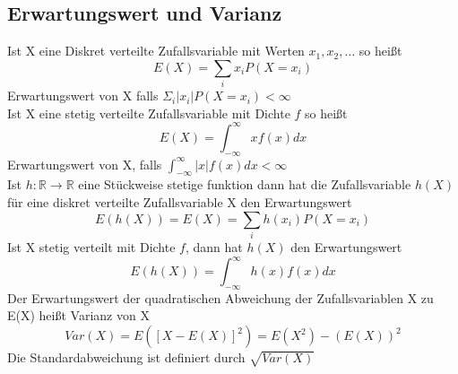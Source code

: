 \documentclass[
	ngerman,
	accentcolor=9c,%
	type=intern,
	marginpar=false
	]{tudapub}
\begin{document}
        \subsection{Erwartungswert und Varianz}
            Ist X eine Diskret verteilte Zufallsvariable mit Werten $x_1, x_2, \dots$ so heißt
            \begin{equation*}
                E(X) = \sum_i x_i P(X=x_i)
            \end{equation*}
            Erwartungswert von X falls $\Sigma_i |x_i| P(X=x_i) < \infty$\\
            Ist X eine stetig verteilte Zufallsvariable mit Dichte $f$ so heißt
            \begin{equation*}
                E(X) = \int_{-\infty}^\infty x f(x) dx 
            \end{equation*}
            Erwartungswert von X, falls $\int_{-\infty}^\infty |x| f(x) dx < \infty$\\
            Ist $h: \mathbb{R} \rightarrow \mathbb{R}$ eine Stückweise stetige funktion dann hat die Zufallsvariable $h(X)$
            für eine diskret verteilte Zufallsvariable X den Erwartungswert
            \begin{equation*}
                E(h(X)) = E(X) = \sum_i h(x_i) P(X=x_i)
            \end{equation*}
            Ist X stetig verteilt mit Dichte $f$, dann hat $h(X)$ den Erwartungswert
            \begin{equation*}
                E(h(X)) = \int_{-\infty}^\infty h(x) f(x) dx 
            \end{equation*}
            Der Erwartungswert  der quadratischen Abweichung der Zufallsvariablen X zu E(X) heißt Varianz von X
            \begin{equation*}
                Var(X) = E([X- E(X)]^2) = E(X^2) - (E(X))^2
            \end{equation*}
            Die Standardabweichung ist definiert durch $\sqrt{Var(X)}$
\end{document}
